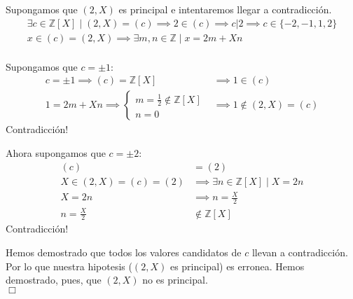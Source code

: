 \begin{solution}
Supongamos que $(2,X)$ es principal e intentaremos llegar a contradicción.
\begin{align}
\exists c \in \mathbb{Z}[X] \mid (2,X) = (c) 
\implies 2 \in (c) 
\implies c|2
\implies c \in \{-2,-1,1,2\}\\
x \in (c) = (2,X) 
\implies \exists m,n\in \mathbb{Z} \mid x = 2m + Xn\\
\end{align}

Supongamos que $c=\pm1$:
\begin{align}
c=\pm1 
\implies (c) = \mathbb{Z}[X]
&\implies 1 \in (c)\\
1 = 2m + Xn 
\implies \begin {cases}
m=\frac{1}{2} \notin \mathbb{Z}[X]\\
n=0
\end{cases}
&\implies 1 \notin (2,X) = (c)
\end{align}
Contradicción!

Ahora supongamos que $c=\pm2$:
\begin{align}
(c) &= (2)\\
X \in (2,X)=(c)=(2)
&\implies \exists n \in \mathbb{Z}[X] \mid X = 2n\\
X=2n &\implies n = \frac{X}{2}\\
n = \frac{X}{2} &\notin \mathbb{Z}[X]
\end{align}
Contradicción!

Hemos demostrado que todos los valores candidatos de $c$ llevan a contradicción.
Por lo que nuestra hipotesis ($(2,X)$ es principal) es erronea. 
Hemos demostrado, pues, que $(2,X)$ no es principal.\\
$\Box$

\end{solution}